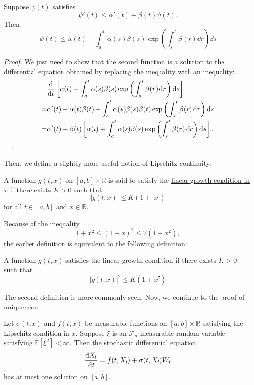 \documentclass[prb,12pt]{revtex4-2}
\theoremstyle{definition}
\theoremstyle{definition}
\theoremstyle{definition}
\newcommand{\R}{\mathbb{R}}
\begin{document}
\begin{Corollary}
	Suppose $\psi(t)$ satisfies
	\[\psi'(t) \le \alpha'(t)+\beta(t)\psi(t).\]
	Then
	\[\psi(t)\le \alpha(t)+\int_a^t \alpha(s)\beta(s)\exp\left(\int_s^t \beta(r)\dd{r}\right)\dd{s}\]
\end{Corollary}
\begin{proof}
	We just need to show that the second function is a solution to the differential equation obtained by replacing the inequality with an inequality:
	\begin{align*}
		&\dv{t}\left[\alpha(t) + \int_a^t \alpha(s)\beta(s)\exp\left(\int_s^t \beta(r)\dd{r}\right)\dd{s}\right]\\
		=&\alpha'(t)+\alpha(t)\beta(t)+\int_a^t \alpha(s)\beta(s)\beta(t)\exp\left(\int_s^t \beta(r)\dd{r}\right)\dd{s}\\
		=&\alpha'(t)+\beta(t)\left[\alpha(t) + \int_a^t \alpha(s)\beta(s)\exp\left(\int_s^t \beta(r)\dd{r}\right)\dd{s}\right].\qedhere
	\end{align*}
\end{proof}
Then, we define a slightly more useful notion of Lipschitz continuity:
\begin{Definition}
	A function $g(t, x)$ on $[a,b]\times \R$ is said to satisfy the \uline{linear growth condition in $x$} if there exists $K>0$ such that
	\[|g(t, x)|\le K(1+|x|)\]
	for all $t\in [a,b]$ and $x\in \R$.
\end{Definition}
Because of the inequality
\[1+x^2 \le (1+x)^2 \le 2(1+x^2),\]
the earlier definition is equivalent to the following definition:
\begin{Proposition}
	A function $g(t,x)$ satisfies the linear growth condition if there exists $K>0$ such that
	\[|g(t,x)|^2 \le K(1+x^2)\]
\end{Proposition}
The second definition is more commonly seen. Now, we continue to the proof of uniqueness:
\begin{Theorem}
	Let $\sigma(t,x)$ and $f(t,x)$ be measurable functions on $[a,b]\times \R$ satisfying the Lipschitz condition in $x$. Suppose $\xi$ is an $\mathcal{F}_a$-measurable random variable satisfying $\mathbb{E}[\xi^2]<\infty$. Then the stochastic differential equation
	\[\dv{X_t}{t}=f(t, X_t)+\sigma(t, X_t)W_t\]
	has at most one solution on $[a,b]$.
\end{Theorem}
\end{document}
